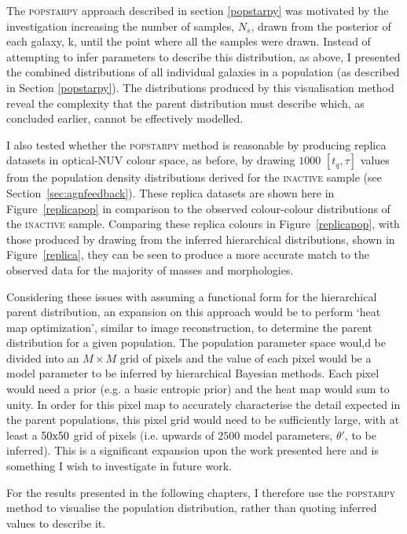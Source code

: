 The \textsc{popstarpy} approach described in section \ref{popstarpy} was motivated by the investigation increasing the number of samples, $N_s$, drawn from the posterior of each galaxy, k, until the point where all the samples were drawn. Instead of attempting to infer parameters to describe this distribution, as above, I presented the combined distributions of all individual galaxies in a population (as described in Section \ref{popstarpy}).  The distributions produced by this visualisation method reveal the complexity that the parent distribution must describe which, as concluded earlier, cannot be effectively modelled.

I also tested whether the \textsc{popstarpy} method is reasonable by producing replica datasets in optical-NUV colour space, as before, by drawing $1000$ $[t_q, \tau]$ values from the population density distributions derived for the \textsc{inactive} sample (see Section~\ref{sec:agnfeedback}). These replica datasets are shown here in Figure~\ref{replicapop} in comparison to the observed colour-colour distributions of the \textsc{inactive} sample. Comparing these replica colours in Figure~\ref{replicapop}, with those produced by drawing from the inferred hierarchical distributions, shown in Figure~\ref{replica}, they can be seen to produce a more accurate match to the observed data for the majority of masses and morphologies. 

Considering these issues with assuming a functional form for the hierarchical parent distribution, an expansion on this approach would be to perform `heat map optimization', similar to image reconstruction, to determine the parent distribution for a given population. The population parameter space woul,d be divided into an $M \times M$ grid of pixels and the value of each pixel would be a model parameter to be inferred by hierarchical Bayesian methods. Each pixel would need a prior (e.g. a basic entropic prior) and the heat map would sum to unity. In order for this pixel map to accurately characterise the detail expected in the parent populations, this pixel grid would need to be sufficiently large, with at least a $50\rm{x}50$ grid of pixels (i.e. upwards of $2500$ model parameters, $\theta'$, to be inferred). This is a significant expansion upon the work presented here and is something I wish to investigate in future work.

For the results presented in the following chapters, I therefore use the \textsc{popstarpy} method to visualise the population distribution, rather than quoting inferred values to describe it.


